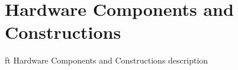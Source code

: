\section{Hardware Components and Constructions}

ft Hardware Components and Constructions description

